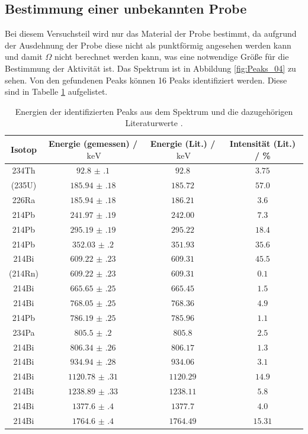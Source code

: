 \subsection{Bestimmung einer unbekannten Probe}
Bei diesem Versuchsteil wird nur  das Material der Probe bestimmt, da aufgrund der Ausdehnung der Probe diese nicht als punktförmig 
angesehen werden kann und damit $\Omega$ nicht berechnet werden kann, was eine notwendige Größe für die Bestimmung der Aktivität ist.
Das Spektrum ist in Abbildung \ref{fig:Peaks_04} zu sehen.
Von den gefundenen Peaks können 16 Peaks identifiziert werden. Diese sind in Tabelle \ref{tab:ident_Peaks} 
aufgelistet.
\FloatBarrier
\begin{table}
  \centering
  \caption{Energien der identifizierten Peaks aus dem Spektrum und die dazugehörigen Literaturwerte \cite{Gamma_lit}.}
  \label{tab:ident_Peaks}
  \begin{tabular}{c c c c}
    \midrule
    Isotop& Energie (gemessen) / $\SI{}{\kilo\eV}$&  Energie (Lit.) / $\SI{}{\kilo\eV}$& Intensität (Lit.) / \%\\
    \midrule
    234Th&$\num{92.8(1)}$&$\num{92.8}$&$\num{3.75}$\\
    (235U)&$\num{185.94(18)}$&$\num{185.72}$&$\num{57.0}$\\
    226Ra&$\num{185.94(18)}$&$\num{186.21}$&$\num{3.6}$\\
    214Pb&$\num{241.97(19)}$&$\num{242.00}$&$\num{7.3}$\\
    214Pb&$\num{295.19(19)}$&$\num{295.22}$&$\num{18.4}$\\
    214Pb&$\num{352.03(20)}$&$\num{351.93}$&$\num{35.6}$\\
    214Bi&$\num{609.22(23)}$&$\num{609.31}$&$\num{45.5}$\\
    (214Rn)&$\num{609.22(23)}$&$\num{609.31}$&$\num{0.1}$\\
    214Bi&$\num{665.65(25)}$&$\num{665.45}$&$\num{1.5}$\\
    214Bi&$\num{768.05(25)}$&$\num{768.36}$&$\num{4.9}$\\
    214Pb&$\num{786.19(25)}$&$\num{785.96}$&$\num{1.1}$\\
    234Pa&$\num{805.5(2)}$&$\num{805.8}$&$\num{2.5}$\\
    214Bi&$\num{806.34(26)}$&$\num{806.17}$&$\num{1.3}$\\
    214Bi&$\num{934.94(28)}$&$\num{934.06}$&$\num{3.1}$\\
    214Bi&$\num{1120.78(31)}$&$\num{1120.29}$&$\num{14.9}$\\
    214Bi&$\num{1238.89(33)}$&$\num{1238.11}$&$\num{5.8}$\\
    214Bi&$\num{1377.6(4)}$&$\num{1377.7}$&$\num{4.0}$\\
    214Bi&$\num{1764.6(4)}$&$\num{1764.49}$&$\num{15.31}$\\
    \bottomrule
  \end{tabular}
\end{table}
